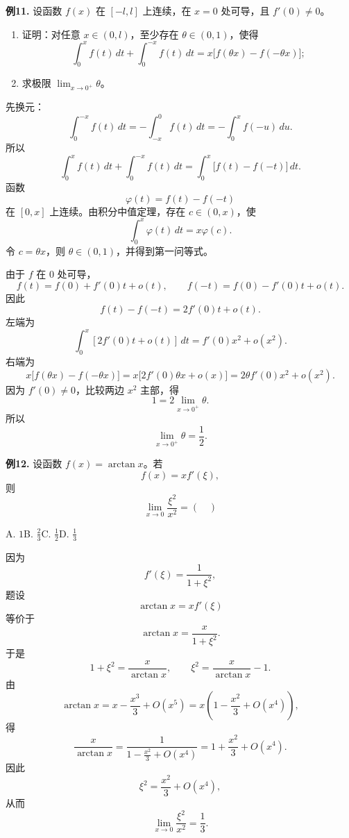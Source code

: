 \begin{problemblock}
\textbf{例11.} 设函数 \(f(x)\) 在 \([-l,l]\) 上连续，在 \(x=0\) 处可导，且 \(f'(0)\ne0\)。
\begin{enumerate}[label=(\arabic*), leftmargin=2.2em]
\item 证明：对任意 \(x\in(0,l)\)，至少存在 \(\theta\in(0,1)\)，使得
\[
\int_0^x f(t)\,dt+\int_0^{-x} f(t)\,dt
=x\bigl[f(\theta x)-f(-\theta x)\bigr];
\]
\item 求极限 \(\displaystyle\lim_{x\to0^+}\theta\)。
\end{enumerate}
\end{problemblock}
\begin{solutionblock}
先换元：
\[
\int_0^{-x} f(t)\,dt=-\int_{-x}^0 f(t)\,dt
=-\int_0^x f(-u)\,du.
\]
所以
\[
\int_0^x f(t)\,dt+\int_0^{-x} f(t)\,dt
=\int_0^x\bigl[f(t)-f(-t)\bigr]\,dt.
\]
函数
\[
\varphi(t)=f(t)-f(-t)
\]
在 \([0,x]\) 上连续。由积分中值定理，存在 \(c\in(0,x)\)，使
\[
\int_0^x\varphi(t)\,dt=x\varphi(c).
\]
令 \(c=\theta x\)，则 \(\theta\in(0,1)\)，并得到第一问等式。

由于 \(f\) 在 \(0\) 处可导，
\[
f(t)=f(0)+f'(0)t+o(t),
\qquad
f(-t)=f(0)-f'(0)t+o(t).
\]
因此
\[
f(t)-f(-t)=2f'(0)t+o(t).
\]
左端为
\[
\int_0^x[2f'(0)t+o(t)]\,dt
=f'(0)x^2+o(x^2).
\]
右端为
\[
x\bigl[f(\theta x)-f(-\theta x)\bigr]
=x\bigl[2f'(0)\theta x+o(x)\bigr]
=2\theta f'(0)x^2+o(x^2).
\]
因为 \(f'(0)\ne0\)，比较两边 \(x^2\) 主部，得
\[
1=2\lim_{x\to0^+}\theta.
\]
所以
\[
\lim_{x\to0^+}\theta=\frac12.
\]
\end{solutionblock}

\begin{problemblock}
\textbf{例12.} 设函数 \(f(x)=\arctan x\)。若
\[
f(x)=x f'(\xi),
\]
则
\[
\lim_{x\to0}\frac{\xi^2}{x^2}=(\quad)
\]

A. \(1\)\qquad B. \(\frac23\)\qquad C. \(\frac12\)\qquad D. \(\frac13\)
\end{problemblock}
\begin{solutionblock}
因为
\[
f'(\xi)=\frac1{1+\xi^2},
\]
题设
\[
\arctan x=x f'(\xi)
\]
等价于
\[
\arctan x=\frac{x}{1+\xi^2}.
\]
于是
\[
1+\xi^2=\frac{x}{\arctan x},
\qquad
\xi^2=\frac{x}{\arctan x}-1.
\]
由
\[
\arctan x=x-\frac{x^3}{3}+O(x^5)
=x\left(1-\frac{x^2}{3}+O(x^4)\right),
\]
得
\[
\frac{x}{\arctan x}
=\frac1{1-\frac{x^2}{3}+O(x^4)}
=1+\frac{x^2}{3}+O(x^4).
\]
因此
\[
\xi^2=\frac{x^2}{3}+O(x^4),
\]
从而
\[
\lim_{x\to0}\frac{\xi^2}{x^2}=\frac13.
\]
\end{solutionblock}
